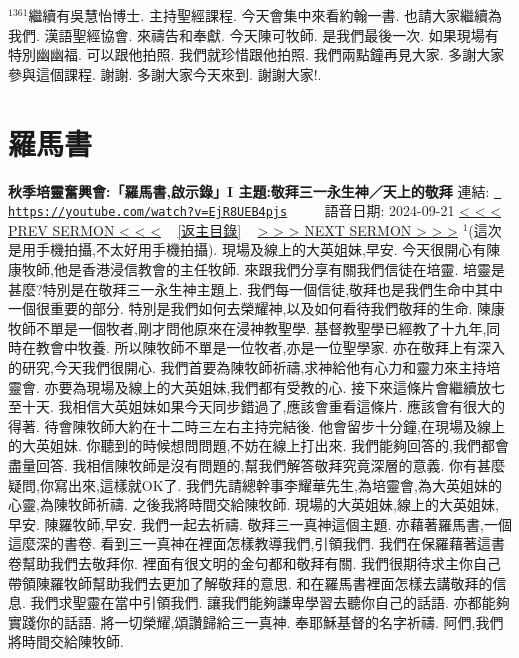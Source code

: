 \documentclass{book}
\begin{document}
$^{1361}$繼續有吳慧怡博士.
主持聖經課程.
今天會集中來看約翰一書.
也請大家繼續為我們.
漢語聖經協會.
來禱告和奉獻.
今天陳可牧師.
是我們最後一次.
如果現場有特別幽幽福.
可以跟他拍照.
我們就珍惜跟他拍照.
我們兩點鐘再見大家.
多謝大家參與這個課程.
謝謝.
多謝大家今天來到.
謝謝大家!.
\newpage



\section{羅馬書}
\label{sec:EjR8UEB4pjs}
\textbf{秋季培靈奮興會:「羅馬書,啟示錄」I 主題:敬拜三一永生神／天上的敬拜}
\newline
\newline
連結: \href{https://youtube.com/watch?v=EjR8UEB4pjs}{\texttt{ https://youtube.com/watch?v=EjR8UEB4pjs}} ~~~~ 語音日期: 2024-09-21 
\newline
\newline
\hyperref[sec:uvYtXSSsYt0]{\small{< < < PREV SERMON < < <}}
~
\hyperref[sec:index]{\small{[返主目錄]}}
~
\hyperref[sec:ltLox1aivp8]{\small{> > > NEXT SERMON > > >}}
\newline
\newline
$^{1}$(這次是用手機拍攝,不太好用手機拍攝).
現場及線上的大英姐妹,早安.
今天很開心有陳康牧師,他是香港浸信教會的主任牧師.
來跟我們分享有關我們信徒在培靈.
培靈是甚麼?特別是在敬拜三一永生神主題上.
我們每一個信徒,敬拜也是我們生命中其中一個很重要的部分.
特別是我們如何去榮耀神,以及如何看待我們敬拜的生命.
陳康牧師不單是一個牧者,剛才問他原來在浸神教聖學.
基督教聖學已經教了十九年,同時在教會中牧養.
所以陳牧師不單是一位牧者,亦是一位聖學家.
亦在敬拜上有深入的研究,今天我們很開心.
我們首要為陳牧師祈禱,求神給他有心力和靈力來主持培靈會.
亦要為現場及線上的大英姐妹,我們都有受教的心.
接下來這條片會繼續放七至十天.
我相信大英姐妹如果今天同步錯過了,應該會重看這條片.
應該會有很大的得著.
待會陳牧師大約在十二時三左右主持完結後.
他會留步十分鐘,在現場及線上的大英姐妹.
你聽到的時候想問問題,不妨在線上打出來.
我們能夠回答的,我們都會盡量回答.
我相信陳牧師是沒有問題的,幫我們解答敬拜究竟深層的意義.
你有甚麼疑問,你寫出來,這樣就OK了.
我們先請總幹事李耀華先生,為培靈會,為大英姐妹的心靈,為陳牧師祈禱.
之後我將時間交給陳牧師.
現場的大英姐妹,線上的大英姐妹,早安.
陳羅牧師,早安.
我們一起去祈禱.
敬拜三一真神這個主題.
亦藉著羅馬書,一個這麼深的書卷.
看到三一真神在裡面怎樣教導我們,引領我們.
我們在保羅藉著這書卷幫助我們去敬拜你.
裡面有很文明的金句都和敬拜有關.
我們很期待求主你自己帶領陳羅牧師幫助我們去更加了解敬拜的意思.
和在羅馬書裡面怎樣去講敬拜的信息.
我們求聖靈在當中引領我們.
讓我們能夠謙卑學習去聽你自己的話語.
亦都能夠實踐你的話語.
將一切榮耀,頌讚歸給三一真神.
奉耶穌基督的名字祈禱.
阿們,我們將時間交給陳牧師.
\end{document}
